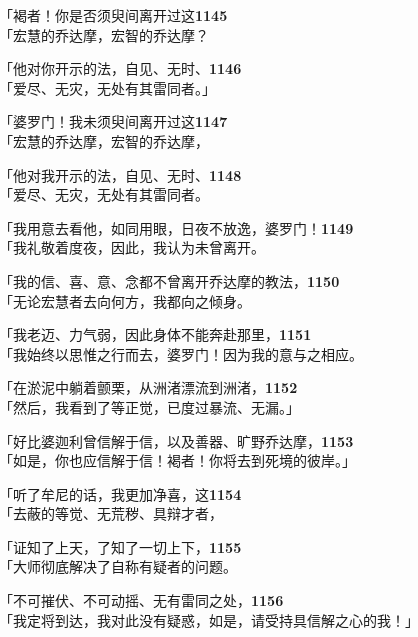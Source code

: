 「褐者！你是否须臾间离开过这\hfill{\grayfootnotesize \textbf{1145}} \\
「宏慧的乔达摩，宏智的乔达摩？


「他对你开示的法，自见、无时、\hfill{\grayfootnotesize \textbf{1146}} \\
「爱尽、无灾，无处有其雷同者。」

「婆罗门！我未须臾间离开过这\hfill{\grayfootnotesize \textbf{1147}} \\
「宏慧的乔达摩，宏智的乔达摩，


「他对我开示的法，自见、无时、\hfill{\grayfootnotesize \textbf{1148}} \\
「爱尽、无灾，无处有其雷同者。

「我用意去看他，如同用眼，日夜不放逸，婆罗门！\hfill{\grayfootnotesize \textbf{1149}} \\
「我礼敬着度夜，因此，我认为未曾离开。


「我的信、喜、意、念都不曾离开乔达摩的教法，\hfill{\grayfootnotesize \textbf{1150}} \\
「无论宏慧者去向何方，我都向之倾身。


「我老迈、力气弱，因此身体不能奔赴那里，\hfill{\grayfootnotesize \textbf{1151}} \\
「我始终以思惟之行而去，婆罗门！因为我的意与之相应。


「在淤泥中躺着颤栗，从洲渚漂流到洲渚，\hfill{\grayfootnotesize \textbf{1152}} \\
「然后，我看到了等正觉，已度过暴流、无漏。」


「好比婆迦利曾信解于信，以及善器、旷野乔达摩，\hfill{\grayfootnotesize \textbf{1153}} \\
「如是，你也应信解于信！褐者！你将去到死境的彼岸。」


「听了牟尼的话，我更加净喜，这\hfill{\grayfootnotesize \textbf{1154}} \\
「去蔽的等觉、无荒秽、具辩才者，


「证知了上天，了知了一切上下，\hfill{\grayfootnotesize \textbf{1155}} \\
「大师彻底解决了自称有疑者的问题。


「不可摧伏、不可动摇、无有雷同之处，\hfill{\grayfootnotesize \textbf{1156}} \\
「我定将到达，我对此没有疑惑，如是，请受持具信解之心的我！」

